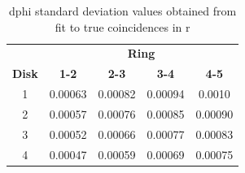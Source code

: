 \begin{table}[H]
  \centering
  \caption[dphi cut values for two-fold in r]{dphi standard deviation values obtained from fit to true coincidences in r}
\begin{tabular}{ccccc}
 & \multicolumn{4}{c}{\textbf{Ring}} \\
\textbf{Disk} & \textbf{1-2} & \textbf{2-3} & \textbf{3-4} & \textbf{4-5} \\
\hline
1 & 0.00063 & 0.00082 & 0.00094 & 0.0010 \\
2 & 0.00057 & 0.00076 & 0.00085 & 0.00090 \\
3 & 0.00052 & 0.00066 & 0.00077 & 0.00083 \\
4 & 0.00047 & 0.00059 & 0.00069 & 0.00075 \\
\end{tabular}
\label{tab:my_label_54}
\end{table}



